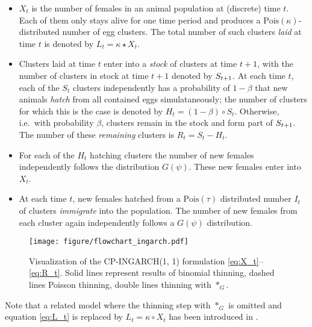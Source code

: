 \documentclass[review]{elsarticle}
\begin{document}
\begin{itemize}
\item $X_t$ is the number of females in an animal population at (discrete) time $t$. Each of them only stays alive for one time period and produces
 a $\text{Pois}(\kappa)$-distributed number of egg clusters. The total number of such clusters \textit{laid} at time $t$ is denoted by $L_t = \kappa \star X_t$.
\item Clusters laid at time $t$ enter into a \textit{stock} of clusters at time $t + 1$, with the number of clusters in stock at time $t + 1$ denoted by $S_{t + 1}$. At each time $t$, each of the $S_t$ clusters independently has a probability of $1 - \beta$ that new animals \textit{hatch} from all contained eggs simulataneously; the number of clusters for which this is the case is denoted by $H_t = (1 - \beta) \circ S_t$. Otherwise, i.e.\ with probability $\beta$, clusters remain in the stock and form part of $S_{t + 1}$. The number of these \textit{remaining} clusters is $R_t = S_t - H_t$.
\item For each of the $H_t$ hatching clusters the number of new females independently follows the distribution $G(\psi)$. These new females enter into $X_t$.
\item At each time $t$, new females hatched from a $\text{Pois}(\tau)$ distributed number $I_t$ of clusters \textit{immigrate} into the population. The number of new females from each cluster again independently follows a $G(\psi)$ distribution.
\end{itemize}

\begin{figure}[h!]
\texttt{[image: figure/flowchart\_ingarch.pdf]}
\caption{Visualization of the CP-INGARCH(1, 1) formulation \eqref{eq:X_t}--\eqref{eq:R_t}. Solid lines represent results of binomial thinning, dashed lines Poisson thinning, double lines thinning with $*_G$.}
\label{fig:ingarch_flowchart}
\end{figure}


Note that a related model where the thinning step with $*_G$ is omitted and equation \eqref{eq:L_t} is replaced by
$L_t = \kappa \circ X_t$ has been introduced in \cite{Bracher2019}.
\end{document}
